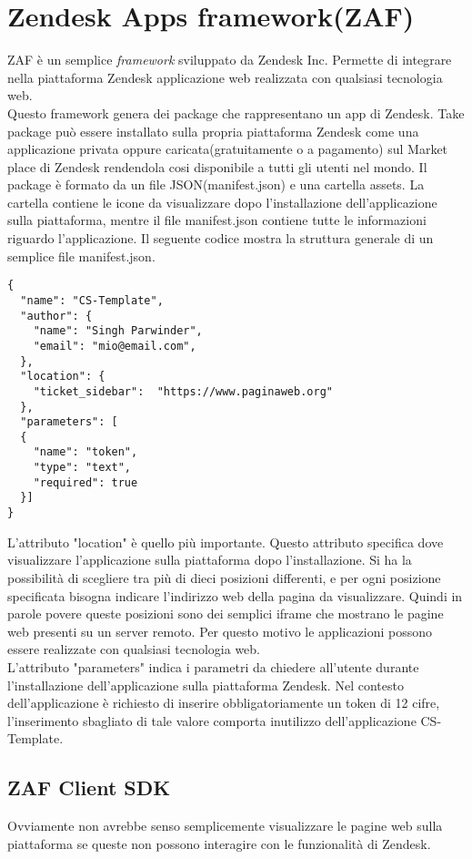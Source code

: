 \section{Zendesk Apps framework(ZAF)}
ZAF è un semplice \emph{framework} sviluppato da Zendesk Inc. Permette di integrare nella piattaforma Zendesk applicazione web realizzata con qualsiasi tecnologia web. 
\\

Questo framework genera dei package che rappresentano un app di Zendesk.
Take package può essere installato sulla propria piattaforma Zendesk come una applicazione privata oppure caricata(gratuitamente o a pagamento) sul Market place di Zendesk rendendola cosi disponibile a tutti gli utenti nel mondo. Il package è formato da un file JSON(manifest.json) e una cartella assets. La cartella contiene le icone da visualizzare dopo l'installazione dell'applicazione sulla piattaforma, mentre il file manifest.json contiene tutte le informazioni riguardo l'applicazione. Il seguente codice mostra la struttura generale di un semplice file manifest.json. \\
\begin{lstlisting}
{
  "name": "CS-Template",
  "author": {
	"name": "Singh Parwinder",
	"email": "mio@email.com",
  },
  "location": {
	"ticket_sidebar":  "https://www.paginaweb.org"
  },	
  "parameters": [
  {
    "name": "token",
	"type": "text",
	"required": true
  }]
}
\end{lstlisting}
L'attributo "location" è quello più importante. Questo attributo specifica dove visualizzare l'applicazione sulla piattaforma dopo l'installazione. Si ha la possibilità di scegliere tra più di dieci posizioni differenti, e per ogni posizione specificata bisogna indicare l'indirizzo web della pagina da visualizzare. Quindi in parole povere queste posizioni sono dei semplici \gls{iframe} che mostrano le pagine web presenti su un server remoto.   Per questo motivo le applicazioni possono essere realizzate con qualsiasi tecnologia web. 
\\

L'attributo "parameters" indica i parametri da chiedere all'utente durante l'installazione dell'applicazione sulla piattaforma Zendesk. Nel contesto dell'applicazione è richiesto di inserire obbligatoriamente un token di 12 cifre, l'inserimento sbagliato di tale valore comporta inutilizzo dell'applicazione CS-Template. 

\subsection{ZAF Client SDK}
Ovviamente non avrebbe senso semplicemente visualizzare le pagine web sulla piattaforma se queste non possono interagire con le funzionalità di Zendesk. 
\\

